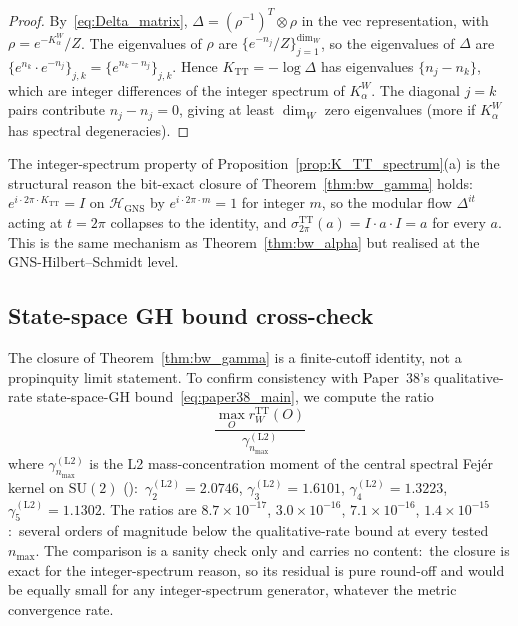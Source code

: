 \documentclass[11pt,a4paper]{article}
\theoremstyle{plain}
\theoremstyle{definition}
\newcommand{\nmax}{n_{\max}}
\newcommand{\Hilb}{\mathcal{H}}
\newcommand{\SU}{\mathrm{SU}}
\newcommand{\TT}{\mathrm{TT}}
\newcommand{\GNS}{\mathrm{GNS}}
\begin{document}
\begin{proof}
By~\eqref{eq:Delta_matrix}, $\Delta = (\rho^{-1})^T \otimes \rho$ in
the vec representation, with $\rho = e^{-K_\alpha^W}/Z$. The
eigenvalues of $\rho$ are $\{e^{-n_j}/Z\}_{j = 1}^{\dim_W}$, so the
eigenvalues of $\Delta$ are $\{e^{n_k} \cdot e^{-n_j}\}_{j, k} =
\{e^{n_k - n_j}\}_{j, k}$. Hence $K_{\TT} = -\log \Delta$ has
eigenvalues $\{n_j - n_k\}$, which are integer differences of the
integer spectrum of $K_\alpha^W$. The diagonal $j = k$ pairs contribute
$n_j - n_j = 0$, giving at least $\dim_W$ zero eigenvalues (more if
$K_\alpha^W$ has spectral degeneracies).
\end{proof}

The integer-spectrum property
of Proposition~\ref{prop:K_TT_spectrum}(a) is the structural reason
the bit-exact closure of Theorem~\ref{thm:bw_gamma} holds:\
$e^{i \cdot 2\pi \cdot K_{\TT}} = I$ on $\Hilb_{\GNS}$ by
$e^{i \cdot 2\pi \cdot m} = 1$ for integer $m$, so the modular flow
$\Delta^{it}$ acting at $t = 2\pi$ collapses to the identity, and
$\sigma_{2\pi}^{\TT}(a) = I \cdot a \cdot I = a$ for every $a$. This is
the same mechanism as Theorem~\ref{thm:bw_alpha} but realised at the
GNS-Hilbert--Schmidt level.

\subsection{State-space GH bound cross-check}\label{sec:propinquity_consistency}

The closure of Theorem~\ref{thm:bw_gamma} is a finite-cutoff identity,
not a propinquity limit statement. To confirm consistency with
Paper~38's qualitative-rate state-space-GH bound~\eqref{eq:paper38_main},
we compute the ratio
\begin{equation*}
   \frac{\max_O r_W^{\TT}(O)}{\gamma_{\nmax}^{(\mathrm{L2})}}
\end{equation*}
where $\gamma_{\nmax}^{(\mathrm{L2})}$ is the L2 mass-concentration
moment of the central spectral Fej\'er kernel on $\SU(2)$
(\cite[Lemma~L2]{paper38}):\
$\gamma_2^{(\mathrm{L2})} = 2.0746$, $\gamma_3^{(\mathrm{L2})} = 1.6101$,
$\gamma_4^{(\mathrm{L2})} = 1.3223$, $\gamma_5^{(\mathrm{L2})} = 1.1302$.
The ratios are $8.7 \times 10^{-17}$, $3.0 \times 10^{-16}$,
$7.1 \times 10^{-16}$, $1.4 \times 10^{-15}$:\ several orders of
magnitude below the qualitative-rate bound at every tested $\nmax$.
The comparison is a sanity check only and carries no content:\ the
closure is exact for the integer-spectrum reason, so its residual is
pure round-off and would be equally small for any integer-spectrum
generator, whatever the metric convergence rate.
\end{document}
